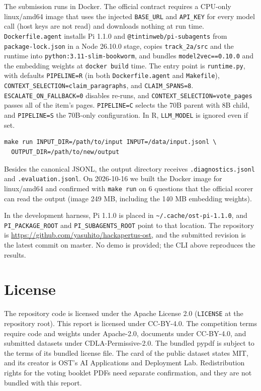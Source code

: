 \documentclass[10pt,a4paper]{article}
\begin{document}
The submission runs in Docker.
The official contract\cite{apiguide} requires a CPU-only linux/amd64 image that uses the injected \texttt{BASE\_URL} and \texttt{API\_KEY} for every model call (host keys are not read) and downloads nothing at run time.
\texttt{Dockerfile.agent} installs Pi 1.1.0 and \texttt{@tintinweb/pi-subagents} from \texttt{package-lock.json} in a Node 26.10.0 stage, copies \texttt{track\_2a/src} and the runtime into \texttt{python:3.11-slim-bookworm}, and bundles \texttt{model2vec==0.10.0} and the embedding weights at \texttt{docker build} time.
The entry point is \texttt{runtime.py}, with defaults \texttt{PIPELINE=R} (in both \texttt{Dockerfile.agent} and \texttt{Makefile}), \texttt{CONTEXT\_SELECTION=claim\_paragraphs}, and \texttt{CLAIM\_SPANS=8}.
\texttt{ESCALATE\_ON\_FALLBACK=0} disables re-runs, and \texttt{CONTEXT\_SELECTION=vote\_pages} passes all of the item's pages. \texttt{PIPELINE=C} selects the 70B parent with 8B child, and \texttt{PIPELINE=S} the 70B-only configuration. In R, \texttt{LLM\_MODEL} is ignored even if set.
\begin{verbatim}
make run INPUT_DIR=/path/to/input INPUT=/data/input.jsonl \
  OUTPUT_DIR=/path/to/new/output
\end{verbatim}
Besides the canonical JSONL, the output directory receives \texttt{.diagnostics.jsonl} and \texttt{.evaluation.jsonl}.
On 2026-10-16 we built the Docker image for linux/amd64 and confirmed with \texttt{make run} on 6 questions that the official scorer can read the output (image 249 MB, including the 140 MB embedding weights).

In the development harness, Pi 1.1.0 is placed in \texttt{\textasciitilde/.cache/ost-pi-1.1.0}, and \texttt{PI\_PACKAGE\_ROOT} and \texttt{PI\_SUBAGENTS\_ROOT} point to that location.
The repository is \url{https://github.com/yasuhito/hackapertus-ost}, and the submitted revision is the latest commit on master. No demo is provided; the CLI above reproduces the results.

\section*{License}

The repository code is licensed under the Apache License 2.0 (\texttt{LICENSE} at the repository root). This report is licensed under CC-BY-4.0.
The competition terms require code and weights under Apache-2.0, documents under CC-BY-4.0, and submitted datasets under CDLA-Permissive-2.0.
The bundled pypdf is subject to the terms of its bundled license file.
The card of the public dataset\cite{dataset} states MIT, and its creator is OST's AI Applications and Deployment Lab. Redistribution rights for the voting booklet PDFs need separate confirmation, and they are not bundled with this report.

\begingroup
\small


\endgroup
\end{document}
